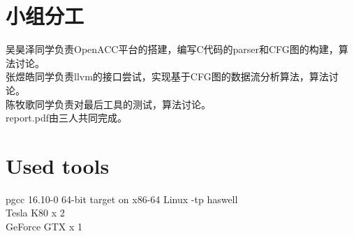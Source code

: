 \documentclass[12pt]{article}
\begin{document}
	\section{小组分工}
		吴昊泽同学负责OpenACC平台的搭建，编写C代码的parser和CFG图的构建，算法讨论。\\
		\indent 张煜皓同学负责llvm的接口尝试，实现基于CFG图的数据流分析算法，算法讨论。 \\
		\indent 陈牧歌同学负责对最后工具的测试，算法讨论。\\
		\indent report.pdf由三人共同完成。
	\section{Used tools}
		pgcc 16.10-0 64-bit target on x86-64 Linux -tp haswell\\
		\indent Tesla K80   x 2\\
		\indent GeForce GTX    x 1\\
		



\end{document}
